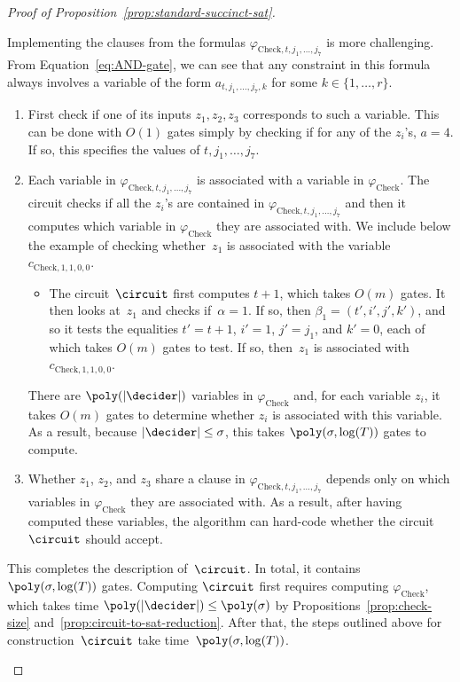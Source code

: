 \begin{proof}[Proof of Proposition~\ref{prop:standard-succinct-sat}]
\begin{definition}
  Implementing the clauses from the formulas $\varphi_{\mathrm{Check}, t, j_1,
    \ldots, j_7}$ is more challenging.
  From Equation~\eqref{eq:AND-gate}, we can see that any constraint in this
  formula always involves a variable of the form $a_{t, j_1, \ldots, j_7, k}$
  for some $k \in \{1, \ldots, r\}$.
  \begin{enumerate}
  \item First check if one of its inputs $z_1, z_2, z_3$ corresponds to such a
    variable.
    This can be done with $O(1)$ gates simply by checking if for any of the
    $z_i$'s, $a = 4$.
    If so, this specifies the values of $t, j_1, \ldots, j_7$.
  \item Each variable in $\varphi_{\mathrm{Check}, t, j_1, \ldots, j_7}$ is
    associated with a variable in $\varphi_{\mathrm{Check}}$.
    The circuit checks if all the $z_i$'s are contained in
    $\varphi_{\mathrm{Check}, t, j_1, \ldots, j_7}$ and then it computes which
    variable in $\varphi_{\mathrm{Check}}$ they are associated with.
    We include below the example of checking whether~$z_1$ is associated with
    the variable $c_{\mathrm{Check},1, 1, 0, 0}$.
    \begin{itemize}
    \item The circuit~$\circuit$ first computes $t+1$, which takes $O(m)$ gates.
      It then looks at~$z_1$ and checks if~$\alpha=1$.
      If so, then $\beta_1 = (t', i', j', k')$, and so it tests the equalities
      $t' = t+1$, $i' = 1$, $j' = j_1$, and $k' = 0$, each of which takes $O(m)$
      gates to test.
      If so, then~$z_1$ is associated with $c_{\mathrm{Check},1, 1, 0, 0}$.
    \end{itemize}
    There are $\poly(|\decider|)$ variables in $\varphi_{\mathrm{Check}}$ and,
    for each variable $z_i$, it takes $O(m)$ gates to determine whether $z_i$ is
    associated with this variable.
    As a result, because $|\decider| \leq \sigma$, this takes $\poly(\sigma,
    \log(T))$ gates to compute.
  \item Whether $z_1$, $z_2$, and $z_3$ share a clause in
    $\varphi_{\mathrm{Check}, t, j_1, \ldots, j_7}$ depends only on which
    variables in $\varphi_{\mathrm{Check}}$ they are associated with.
    As a result, after having computed these variables, the algorithm can
    hard-code whether the circuit~$\circuit$ should accept.
  \end{enumerate}
  This completes the description of~$\circuit$.
  In total, it contains $\poly(\sigma, \log(T))$ gates.
  Computing $\circuit$ first requires computing $\varphi_{\mathrm{Check}}$,
  which takes time $\poly(|\decider|) \leq \poly(\sigma)$ by
  Propositions~\ref{prop:check-size} and~\ref{prop:circuit-to-sat-reduction}.
  After that, the steps outlined above for construction~$\circuit$ take
  time~$\poly(\sigma, \log(T))$.
\end{definition}


\end{proof}
